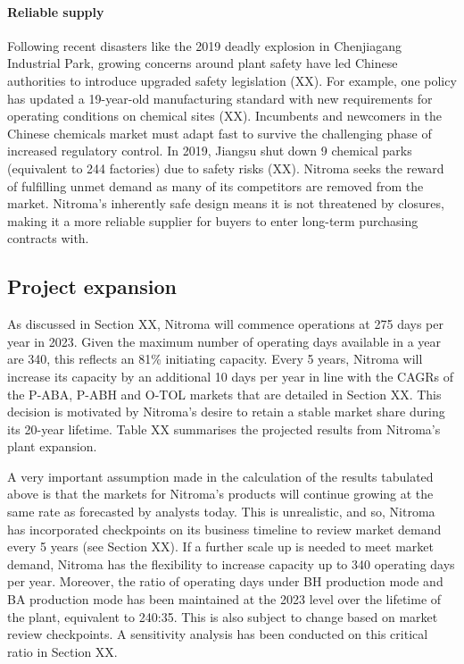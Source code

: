 \paragraph{Reliable supply}
Following recent disasters like the 2019 deadly explosion in Chenjiagang Industrial Park, growing concerns around plant safety have led Chinese authorities to introduce upgraded safety legislation (XX). For example, one policy has updated a 19-year-old manufacturing standard with new requirements for operating conditions on chemical sites (XX). Incumbents and newcomers in the Chinese chemicals market must adapt fast to survive the challenging phase of increased regulatory control. In 2019, Jiangsu shut down 9 chemical parks (equivalent to 244 factories) due to safety risks (XX). Nitroma seeks the reward of fulfilling unmet demand as many of its competitors are removed from the market. Nitroma’s inherently safe design means it is not threatened by closures, making it a more reliable supplier for buyers to enter long-term purchasing contracts with.

\subsection{Project expansion}
As discussed in Section XX, Nitroma will commence operations at 275 days per year in 2023. Given the maximum number of operating days available in a year are 340, this reflects an 81\% initiating capacity. Every 5 years, Nitroma will increase its capacity by an additional 10 days per year in line with the CAGRs of the P-ABA, P-ABH and O-TOL markets that are detailed in Section XX.  This decision is motivated by Nitroma’s desire to retain a stable market share during its 20-year lifetime. Table XX summarises the projected results from Nitroma’s plant expansion.

A very important assumption made in the calculation of the results tabulated above is that the markets for Nitroma’s products will continue growing at the same rate as forecasted by analysts today. This is unrealistic, and so, Nitroma has incorporated checkpoints on its business timeline to review market demand every 5 years (see Section XX). If a further scale up is needed to meet market demand, Nitroma has the flexibility to increase capacity up to 340 operating days per year. Moreover, the ratio of operating days under BH production mode and BA production mode has been maintained at the 2023 level over the lifetime of the plant, equivalent to 240:35. This is also subject to change based on market review checkpoints. A sensitivity analysis has been conducted on this critical ratio in Section XX.

